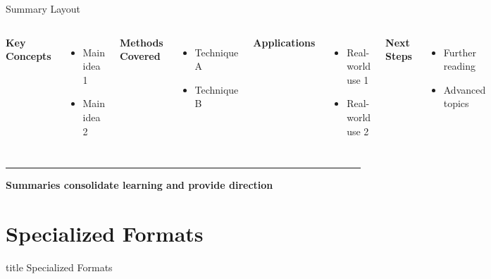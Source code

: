 \documentclass[8pt,aspectratio=169]{beamer}
\newcommand{\bottomnote}[1]{%
\vfill
\vspace{-2mm}
\textcolor{mllavender2}{\rule{\textwidth}{0.4pt}}
\vspace{1mm}
\footnotesize
\textbf{#1}
}
\begin{document}
\begin{frame}[t]{Summary Layout}
\begin{columns}[T]
\textbf{Key Concepts}
\begin{itemize}
\item Main idea 1
\item Main idea 2
\end{itemize}

\vspace{0.5em}
\textbf{Methods Covered}
\begin{itemize}
\item Technique A
\item Technique B
\end{itemize}

\textbf{Applications}
\begin{itemize}
\item Real-world use 1
\item Real-world use 2
\end{itemize}

\vspace{0.5em}
\textbf{Next Steps}
\begin{itemize}
\item Further reading
\item Advanced topics
\end{itemize}
\end{columns}

\vspace{1em}
\begin{center}
\framebox[0.95\textwidth][c]{
\vspace{4.5cm}
\textcolor{midgray}{[Summary Dashboard/Visual]}
\vspace{4.5cm}
}
\end{center}

\bottomnote{Summaries consolidate learning and provide direction}
\end{frame}

\section{Specialized Formats}

\begin{frame}[t]
\vfill
\centering
\begin{beamercolorbox}[sep=8pt,center]{title}
\Large Specialized Formats\par
\end{beamercolorbox}
\vfill
\end{frame}
\end{document}

